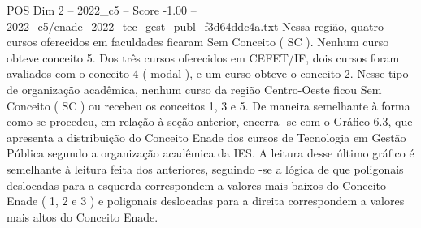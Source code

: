 \begin{textsample}{POS Dim 2 – 2022\_c5 – Score -1.00 – 2022\_c5/enade\_2022\_tec\_gest\_publ\_f3d64ddc4a.txt}
Nessa região, quatro cursos oferecidos em faculdades ficaram Sem Conceito ( SC ).
Nenhum curso obteve conceito 5.
Dos três cursos oferecidos em CEFET/IF, dois cursos foram avaliados com o conceito 4 ( modal ), e um curso obteve o conceito 2.
Nesse tipo de organização acadêmica, nenhum curso da região Centro-Oeste ficou Sem Conceito ( SC ) ou recebeu os conceitos 1, 3 e 5.
De maneira semelhante à forma como se procedeu, em relação à seção anterior, encerra -se com o Gráfico 6.3, que apresenta a distribuição do Conceito Enade dos cursos de Tecnologia em Gestão Pública segundo a organização acadêmica da IES.
A leitura desse último gráfico é semelhante à leitura feita dos anteriores, seguindo -se a lógica de que poligonais deslocadas para a esquerda correspondem a valores mais baixos do Conceito Enade ( 1, 2 e 3 ) e poligonais deslocadas para a direita correspondem a valores mais altos do Conceito Enade.

\end{textsample}
